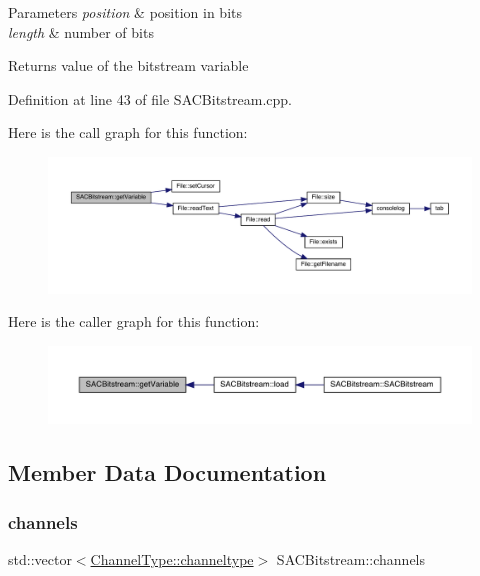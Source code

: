 \begin{DoxyParams}{Parameters}
{\em position} & position in bits \\
\hline
{\em length} & number of bits \\
\hline
\end{DoxyParams}
\begin{DoxyReturn}{Returns}
value of the bitstream variable 
\end{DoxyReturn}


Definition at line 43 of file S\+A\+C\+Bitstream.\+cpp.

Here is the call graph for this function\+:
\nopagebreak
\begin{figure}[H]
\begin{center}
\leavevmode
\includegraphics[width=350pt]{class_s_a_c_bitstream_ad0f39852ca2853efa15be087ce68c3b9_cgraph}
\end{center}
\end{figure}
Here is the caller graph for this function\+:
\nopagebreak
\begin{figure}[H]
\begin{center}
\leavevmode
\includegraphics[width=350pt]{class_s_a_c_bitstream_ad0f39852ca2853efa15be087ce68c3b9_icgraph}
\end{center}
\end{figure}


\subsection{Member Data Documentation}
\mbox{\label{class_s_a_c_bitstream_a385f676be794f5bb9bec896ef6eda43c}} 
\subsubsection{\texorpdfstring{channels}{channels}}
{\footnotesize\ttfamily std\+::vector$<$\hyperlink{struct_s_a_c_bitstream_1_1_channel_type_a31c32b34085c06a1c58d920ca28c17c9}{Channel\+Type\+::channeltype}$>$ S\+A\+C\+Bitstream\+::channels}

